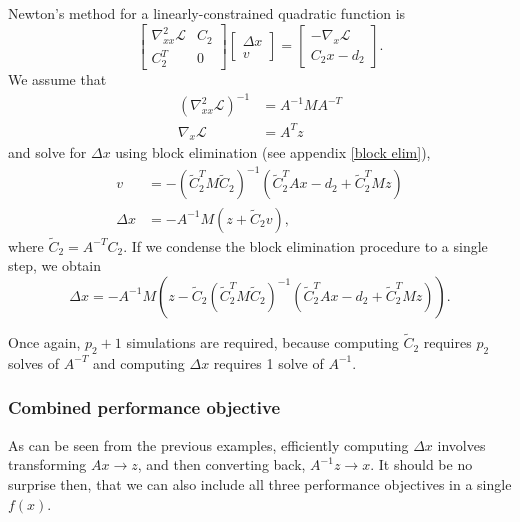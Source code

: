 \documentclass{article}
\newcommand{\tC}{\tilde{C}}
\begin{document}
Newton's method for a linearly-constrained quadratic function is
    \begin{equation}
    \begin{bmatrix} \nabla_{xx}^2 \mathcal{L} & C_2 \\ C_2^T & 0 \end{bmatrix} 
    \begin{bmatrix} \Delta x \\ v \end{bmatrix} = 
    \begin{bmatrix} -\nabla_x\mathcal{L} \\ C_2 x - d_2 \end{bmatrix}.
    \end{equation}
We assume that 
    \begin{subequations}\begin{align}
    (\nabla_{xx}^2 \mathcal{L})^{-1} &= A^{-1} M A^{-T} \\
    \nabla_x \mathcal{L} &= A^T z
    \end{align}\end{subequations}
    and solve for $\Delta x$ 
    using block elimination (see appendix \ref{block elim}),
    \begin{subequations}\begin{align}
    v &= -(\tC_2^T M \tC_2)^{-1}(\tC_2^T Ax - d_2 + \tC_2^T Mz) \\
    \Delta x &= -A^{-1} M (z + \tC_2 v),
    \end{align}\end{subequations}
    where $\tC_2 = A^{-T} C_2$.
    If we condense the block elimination procedure to a single step,
    we obtain
    \begin{equation}
    \Delta x = -A^{-1} M (z - 
        \tC_2 (\tC_2^T M \tC_2)^{-1}(\tC_2^T Ax - d_2 + \tC_2^T Mz)).
    \end{equation}


Once again, $p_2 + 1$ simulations are required, 
    because computing $\tC_2$ requires $p_2$ solves of $A^{-T}$ and
    computing $\Delta x$ requires 1 solve of $A^{-1}$.

\subsubsection{Combined performance objective}
As can be seen from the previous examples,
    efficiently computing $\Delta x$ involves transforming $Ax \to z$,
    and then converting back, $A^{-1}z \to x$.
It should be no surprise then, 
    that we can also include all three performance objectives 
    in a single $f(x)$.
\end{document}
